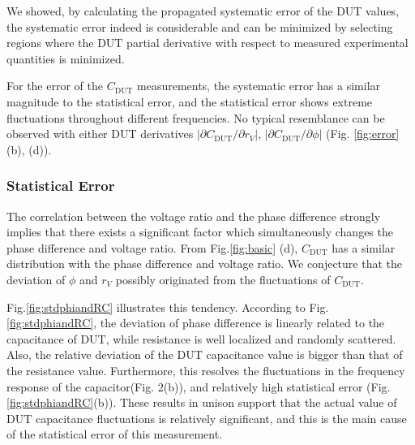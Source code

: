 \documentclass[%
 aip,
 amsmath,amssymb,
 reprint,%
]{revtex4-1}
\begin{document}
 We showed, by calculating the propagated systematic error of the DUT values, the systematic error indeed is considerable and can be minimized by selecting regions where the DUT partial derivative with respect to measured experimental quantities is minimized.
 
For the error of the $C_{\textrm{DUT}}$ measurements, the systematic error has a similar magnitude to the statistical error, and the statistical error shows extreme fluctuations throughout different frequencies. No typical resemblance can be observed with either DUT derivatives  $|\partial C_{\textrm{DUT}}/\partial r_V|$, $|\partial C_{\textrm{DUT}}/\partial \phi|$ (Fig. \ref{fig:error} (b), (d)).

 
\subsubsection*{Statistical Error}
The correlation between the voltage ratio and the phase difference strongly implies that there exists a significant factor which simultaneously changes the phase difference and voltage ratio. From Fig.\ref{fig:basic} (d), $C_{\textrm{DUT}}$ has a similar distribution with the phase difference and voltage ratio. We conjecture that the deviation of $\phi$ and $r_V$ possibly originated from the fluctuations of $C_\textrm{DUT}$.

Fig.\ref{fig:stdphiandRC} illustrates this tendency. According to Fig.\ref{fig:stdphiandRC}, the deviation of phase difference is linearly related to the capacitance of DUT, while resistance is well localized and randomly scattered. Also, the relative deviation of the DUT capacitance value is bigger than that of the resistance value. Furthermore, this resolves the fluctuations in the frequency response of the capacitor(Fig. 2(b)), and relatively high statistical error (Fig. \ref{fig:stdphiandRC}(b)). These results in unison support that the actual value of DUT capacitance fluctuations is relatively significant, and this is the main cause of the statistical error of this measurement.
\end{document}
